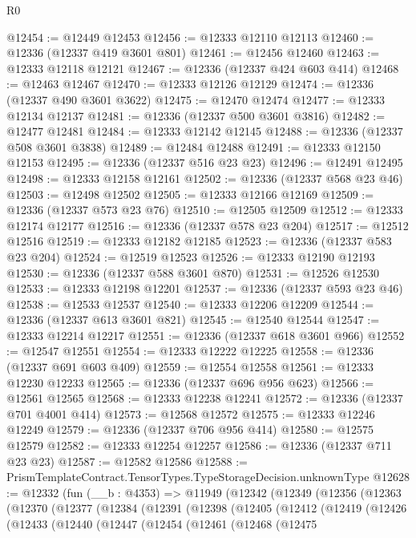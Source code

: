 \begin{lexlean}{R0}
\begin{coremodule}
@12454 := @12449 @12453
@12456 := @12333 @12110 @12113
@12460 := @12336 (@12337 @419 @3601 @801)
@12461 := @12456 @12460
@12463 := @12333 @12118 @12121
@12467 := @12336 (@12337 @424 @603 @414)
@12468 := @12463 @12467
@12470 := @12333 @12126 @12129
@12474 := @12336 (@12337 @490 @3601 @3622)
@12475 := @12470 @12474
@12477 := @12333 @12134 @12137
@12481 := @12336 (@12337 @500 @3601 @3816)
@12482 := @12477 @12481
@12484 := @12333 @12142 @12145
@12488 := @12336 (@12337 @508 @3601 @3838)
@12489 := @12484 @12488
@12491 := @12333 @12150 @12153
@12495 := @12336 (@12337 @516 @23 @23)
@12496 := @12491 @12495
@12498 := @12333 @12158 @12161
@12502 := @12336 (@12337 @568 @23 @46)
@12503 := @12498 @12502
@12505 := @12333 @12166 @12169
@12509 := @12336 (@12337 @573 @23 @76)
@12510 := @12505 @12509
@12512 := @12333 @12174 @12177
@12516 := @12336 (@12337 @578 @23 @204)
@12517 := @12512 @12516
@12519 := @12333 @12182 @12185
@12523 := @12336 (@12337 @583 @23 @204)
@12524 := @12519 @12523
@12526 := @12333 @12190 @12193
@12530 := @12336 (@12337 @588 @3601 @870)
@12531 := @12526 @12530
@12533 := @12333 @12198 @12201
@12537 := @12336 (@12337 @593 @23 @46)
@12538 := @12533 @12537
@12540 := @12333 @12206 @12209
@12544 := @12336 (@12337 @613 @3601 @821)
@12545 := @12540 @12544
@12547 := @12333 @12214 @12217
@12551 := @12336 (@12337 @618 @3601 @966)
@12552 := @12547 @12551
@12554 := @12333 @12222 @12225
@12558 := @12336 (@12337 @691 @603 @409)
@12559 := @12554 @12558
@12561 := @12333 @12230 @12233
@12565 := @12336 (@12337 @696 @956 @623)
@12566 := @12561 @12565
@12568 := @12333 @12238 @12241
@12572 := @12336 (@12337 @701 @4001 @414)
@12573 := @12568 @12572
@12575 := @12333 @12246 @12249
@12579 := @12336 (@12337 @706 @956 @414)
@12580 := @12575 @12579
@12582 := @12333 @12254 @12257
@12586 := @12336 (@12337 @711 @23 @23)
@12587 := @12582 @12586
@12588 := PrismTemplateContract.TensorTypes.TypeStorageDecision.unknownType
@12628 := @12332
    (fun (__b : @4353) =>
    @11949
      (@12342
        (@12349
          (@12356
            (@12363
              (@12370
                (@12377
                  (@12384
                    (@12391
                      (@12398
                        (@12405
                          (@12412
                            (@12419
                              (@12426
                                (@12433
                                  (@12440
                                    (@12447
                                      (@12454
                                        (@12461
                                          (@12468
                                            (@12475

\end{coremodule}
\end{lexlean}

